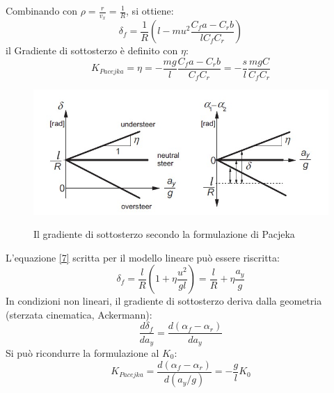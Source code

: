Combinando con $\rho = \frac{r}{v_x} = \frac{1}{R}$, si ottiene:
\begin{equation} \label{8}
\delta_f = \frac{1}{R} (l - mu^2\frac{C_f a - C_r b}{l C_f C_r})
\end{equation}
il Gradiente di sottosterzo è definito con $\eta$:
\begin{equation}
    K_{Pacejka} = \eta = -\frac{mg}{l} \frac{C_fa-C_rb}{C_fC_r} = -\frac{s}{l} \frac{mgC}{C_fC_r}
\end{equation}
\begin{figure}[!h]
    \centering
    \includegraphics[scale=0.7]{Immagini/Understeer Gradient/Pacjeka understeer gradient.jpg}
    \label{fig:Pacjeka understeer gradient}
    \caption{Il gradiente di sottosterzo secondo la formulazione di Pacjeka}
\end{figure}
L'equazione \ref{7} scritta per il modello lineare può essere riscritta:\\
\begin{equation}
\delta_f = \frac{l}{R}( 1 + \eta\frac{u^2}{gl} ) = \frac{l}{R} + \eta \frac{a_y}{g}
\end{equation}
In condizioni non lineari, il gradiente di sottosterzo deriva dalla geometria (sterzata cinematica, Ackermann):\\
\begin{equation}
\frac{d\delta_f}{da_y} = \frac{d(\alpha_f - \alpha_r)}{da_y}
\end{equation}
Si può ricondurre la formulazione al $K_0$:
\begin{equation}
K_{Pacejka} = \frac{d(\alpha_f - \alpha_r)}{d(a_y/g)} = -\frac{g}{l} K_0
\end{equation}

